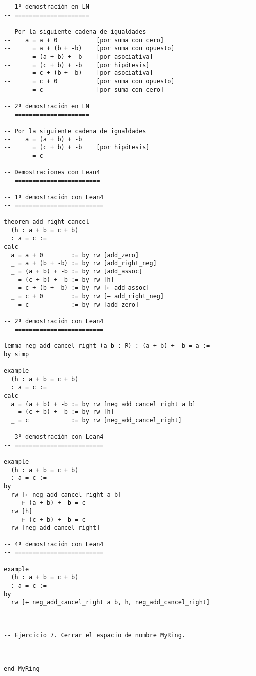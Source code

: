 \begin{verbatim}
-- 1ª demostración en LN
-- =====================

-- Por la siguiente cadena de igualdades
--    a = a + 0           [por suma con cero]
--      = a + (b + -b)    [por suma con opuesto]
--      = (a + b) + -b    [por asociativa]
--      = (c + b) + -b    [por hipótesis]
--      = c + (b + -b)    [por asociativa]
--      = c + 0           [por suma con opuesto]
--      = c               [por suma con cero]

-- 2ª demostración en LN
-- =====================

-- Por la siguiente cadena de igualdades
--    a = (a + b) + -b
--      = (c + b) + -b    [por hipótesis]
--      = c

-- Demostraciones con Lean4
-- ========================

-- 1ª demostración con Lean4
-- =========================

theorem add_right_cancel
  (h : a + b = c + b)
  : a = c :=
calc
  a = a + 0        := by rw [add_zero]
  _ = a + (b + -b) := by rw [add_right_neg]
  _ = (a + b) + -b := by rw [add_assoc]
  _ = (c + b) + -b := by rw [h]
  _ = c + (b + -b) := by rw [← add_assoc]
  _ = c + 0        := by rw [← add_right_neg]
  _ = c            := by rw [add_zero]

-- 2ª demostración con Lean4
-- =========================

lemma neg_add_cancel_right (a b : R) : (a + b) + -b = a :=
by simp

example
  (h : a + b = c + b)
  : a = c :=
calc
  a = (a + b) + -b := by rw [neg_add_cancel_right a b]
  _ = (c + b) + -b := by rw [h]
  _ = c            := by rw [neg_add_cancel_right]

-- 3ª demostración con Lean4
-- =========================

example
  (h : a + b = c + b)
  : a = c :=
by
  rw [← neg_add_cancel_right a b]
  -- ⊢ (a + b) + -b = c
  rw [h]
  -- ⊢ (c + b) + -b = c
  rw [neg_add_cancel_right]

-- 4ª demostración con Lean4
-- =========================

example
  (h : a + b = c + b)
  : a = c :=
by
  rw [← neg_add_cancel_right a b, h, neg_add_cancel_right]

-- ---------------------------------------------------------------------
-- Ejercicio 7. Cerrar el espacio de nombre MyRing.
-- ----------------------------------------------------------------------

end MyRing
\end{verbatim}

